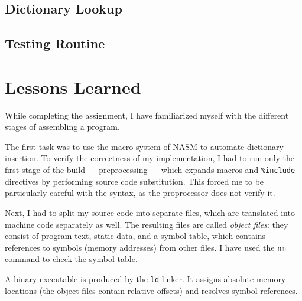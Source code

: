 \documentclass[12pt,a4paper]{report}
\begin{document}


\subsection*{Dictionary Lookup}



\subsection*{Testing Routine}



\section*{Lessons Learned}

While completing the assignment, I have familiarized myself with the different
stages of assembling a program.

The first task was to use the macro system of NASM to automate dictionary insertion.
To verify the correctness of my implementation, I had to run only the first stage of
the build — preprocessing — which expands macros and \texttt{\%include} directives by
performing source code substitution. This forced me to be particularly careful
with the syntax, as the proprocessor does not verify it.

Next, I had to split my source code into separate files, which are translated
into machine code separately as well. The resulting files are called \textit{object files}:
they consist of program text, static data, and a symbol table, which contains
references to symbols (memory addresses) from other files. I have used the \texttt{nm}
command to check the symbol table.

A binary executable is produced by the \texttt{ld} linker. It assigns absolute memory
locations (the object files contain relative offsets) and resolves symbol references.
\end{document}
